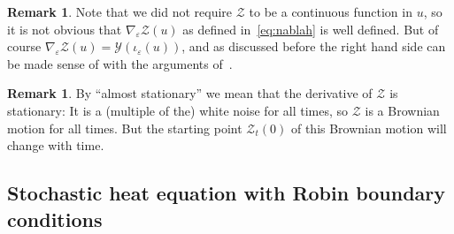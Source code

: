 \documentclass[10pt]{amsart}
\theoremstyle{definition}\newtheorem{defi}[theo]{Definition}\newtheorem{rema}[theo]{Remark}\newtheorem{exam}[theo]{Example}\newtheorem{exem}[theo]{Example}\newtheorem{nota}[theo]{Notation}
\newcommand{\mc}[1]{{\mathcal #1}}
\renewcommand{\mc}[1]{{\mathcal #1}}
\begin{document}
\begin{rema}
Note that we did not require $\mc Z$ to be a continuous function in $u$, so it is not obvious that $\nabla_\varepsilon \mc Z(u)$ as defined in~\eqref{eq:nablah} is well defined. But of course $\nabla_\varepsilon \mc Z(u) = \mc Y(\iota_\varepsilon(u))$, and as discussed before the right hand side can be made sense of with the arguments of~\cite[Remark~4]{gj2014}.
\end{rema}

\begin{rema}
By ``almost stationary'' we mean that the derivative of $\mc Z$ is stationary: It is a (multiple of the) white noise for all times, so $\mc Z$ is a Brownian motion for all times. But the starting point $\mc Z_t(0)$ of this Brownian motion will change with time.
\end{rema}

\subsection{Stochastic heat equation with Robin boundary conditions}\label{app:she}
\end{document}
